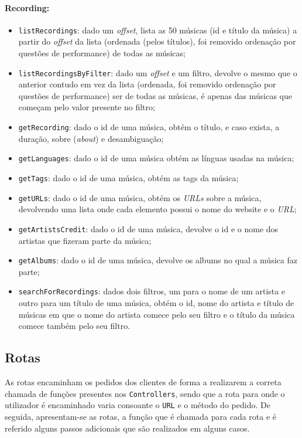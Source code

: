 \documentclass{article}
\begin{document}
\paragraph{\textbf{Recording:}}
    \begin{itemize}
        \item \texttt{listRecordings}: dado um \textit{offset}, lista as 50 músicas (id e título da música) a partir do \textit{offset} da lista (ordenada (pelos títulos), foi removido ordenação por questões de performance) de todas as músicas;
        \item \texttt{listRecordingsByFilter}: dado um \textit{offset} e um filtro, devolve o mesmo que o anterior contudo em vez da lista (ordenada, foi removido ordenação por questões de performance) ser de todas as músicas, é apenas das músicas que começam pelo valor presente no filtro;
        \item \texttt{getRecording}: dado o id de uma música, obtém o título, e caso exista, a duração, sobre (\textit{about}) e desambiguação;
        \item \texttt{getLanguages}: dado o id de uma música obtém as línguas usadas na música;
        \item \texttt{getTags}: dado o id de uma música, obtém as tags da música;
        \item \texttt{getURLs}: dado o id de uma música, obtém os \textit{URLs} sobre a música, devolvendo uma lista onde cada elemento possui o nome do website e o \textit{URL};
        \item \texttt{getArtistsCredit}: dado o id de uma música, devolve o id e o nome dos artistas que fizeram parte da música;
        \item \texttt{getAlbums}: dado o id de uma música, devolve os albums no qual a música faz parte;
        \item \texttt{searchForRecordings}: dados dois filtros, um para o nome de um artista e outro para um título de uma música, obtém o id, nome do artista e título de músicas em que o nome do artista comece pelo seu filtro e o título da música comece também pelo seu filtro.
    \end{itemize}

\subsection{Rotas}

As rotas encaminham os pedidos dos clientes de forma a realizarem a correta chamada de funções presentes nos \texttt{Controllers}, sendo que a rota para onde o utilizador é encaminhado varia consoante o \texttt{URL} e o método do pedido.
De seguida, apresentam-se as rotas, a função que é chamada para cada rota e é referido alguns passos adicionais que são realizados em alguns casos.
\end{document}
